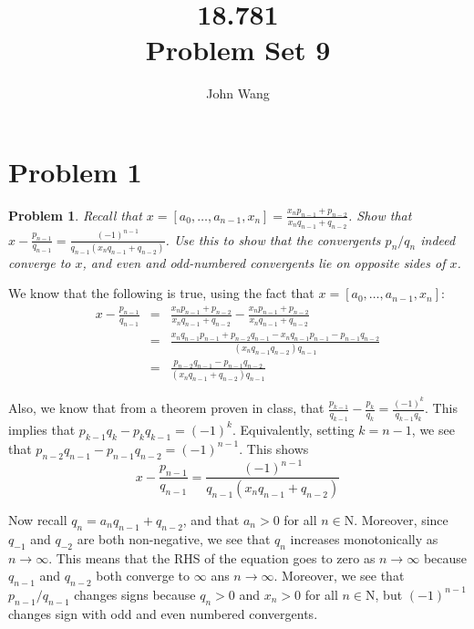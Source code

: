 \documentclass[psamsfonts]{amsart}
\title{18.781 \\
Problem Set 9}
\author{John Wang}
\newtheorem{prob}{Problem}[section]
\newenvironment{sol}{{\bfseries Solution}}{\qedsymbol}
\theoremstyle{definition}
\theoremstyle{remark}
\numberwithin{equation}{section}
\begin{document}
\maketitle

\section{Problem 1}

\begin{prob}
Recall that $x = [a_0, \ldots, a_{n-1}, x_n] = \frac{x_n p_{n-1} + p_{n-2}}{x_n q_{n-1} + q_{n-2}}$. Show that $x - \frac{p_{n-1}}{q_{n-1}} = \frac{(-1)^{n-1}}{q_{n-1}(x_n q_{n-1} + q_{n-2})}$. Use this to show that the convergents $p_n/q_n$ indeed converge to $x$, and even and odd-numbered convergents lie on opposite sides of $x$.
\end{prob}

\begin{sol}
We know that the following is true, using the fact that $x = [a_0, \ldots, a_{n-1}, x_n]$:
\begin{eqnarray}
x - \frac{p_{n-1}}{q_{n-1}} &=& \frac{ x_n p_{n-1} + p_{n-2}}{x_n q_{n-1} + q_{n-2} } - \frac{ x_n p_{n-1} + p_{n-2}}{x_n q_{n-1} + q_{n-2}} \\
&=& \frac{x_n q_{n-1} p_{n-1} + p_{n-2} q_{n-1} - x_n q_{n-1} p_{n-1} - p_{n-1} q_{n-2}}{(x_n q_{n-1} q_{n-2}) q_{n-1}} \\
&=& \frac{p_{n-2} q_{n-1} - p_{n-1} q_{n-2}}{(x_n q_{n-1} + q_{n-2}) q_{n-1}}
\end{eqnarray}

Also, we know that from a theorem proven in class, that $\frac{p_{k-1}}{q_{k-1}} - \frac{p_k}{q_k} = \frac{(-1)^k}{q_{k-1} q_k}$. This implies that $p_{k-1} q_k - p_k q_{k-1} = (-1)^k$. Equivalently, setting $k = n - 1$, we see that $p_{n-2} q_{n-1} - p_{n-1} q_{n-2} = (-1)^{n-1}$. This shows
\begin{equation}
x - \frac{p_{n-1}}{q_{n-1}} = \frac{(-1)^{n-1}}{q_{n-1}(x_n q_{n-1} + q_{n-2})}
\end{equation}

Now recall $q_{n} = a_n q_{n-1} + q_{n-2}$, and that $a_n > 0$ for all $n \in \mathrm{N}$. Moreover, since $q_{-1}$ and $q_{-2}$ are both non-negative, we see that $q_{n}$ increases monotonically as $n \to \infty$. This means that the RHS of the equation goes to zero as $n \to \infty$ because $q_{n-1}$ and $q_{n-2}$ both converge to $\infty$ ans $n \to \infty$. Moreover, we see that $p_{n-1}/q_{n-1}$ changes signs because $q_{n} > 0$ and $x_n > 0$ for all $n \in \mathrm{N}$, but $(-1)^{n-1}$ changes sign with odd and even numbered convergents. 
\end{sol}
\end{document}
